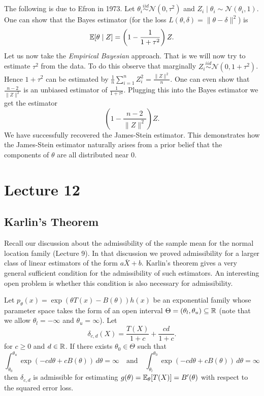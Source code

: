 The following is due to Efron in 1973. Let $\theta_i \overset{iid}{\sim}  \mathcal{N}(0, \tau^2)$ and $Z_i \mid \theta_i \sim \mathcal{N}(\theta_i, 1).$ One can show that the Bayes estimator (for the loss $L(\theta, \delta) = \|\theta - \delta\|^2$) is \[
	\mathbb{E}[\theta \mid Z] = \left(1 - \frac{1}{1+\tau^2}\right) Z.
\] Let us now take the \textit{Empirical Bayesian} approach. That is we will now try to estimate $\tau^2$ from the data. To do this observe that marginally $Z_i \overset{iid}{\sim} \mathcal N(0, 1 + \tau^2)$. Hence $1 + \tau^2$ can be estimated by $\frac{1}{n} \sum_{i=1}^n Z_i^2 = \frac{\|Z\|^2}{n}$.  One can even show that $\frac{n-2}{\|Z\|^2}$ is an unbiased estimator of $\frac{1}{1+\tau^2}$. Plugging this into the Bayes estimator we get the estimator \[
	\left(1 - \frac{n-2}{\|Z\|^2}\right) Z.
\] We have successfully recovered the James-Stein estimator. This demonstrates how the James-Stein estimator naturally arises from a prior belief that the components of $\theta$ are all distributed near $0$. 





\newpage

\section{Lecture 12}

\subsection{Karlin's Theorem}

Recall our discussion about the admissibility of the sample mean for the normal location family (Lecture 9). In that discussion we proved admissibility for a larger class of linear estimators of the form $a \bar{X} + b$. Karlin's theorem gives a very general sufficient condition for the admissibility of such estimators. An interesting open problem is whether this condition is also necessary for admissibility.

\begin{theorem}
	Let $p_\theta(x) = \exp(\theta T(x) - B(\theta)) h(x)$ be an exponential family whose parameter space takes the form of an open interval $\Theta = (\theta_l, \theta_u) \subseteq \mathbb{R}$ (note that we allow $\theta_l = -\infty$ and $\theta_u = \infty$). Let \[
		\delta_{c,d}(X) = \frac{T(X)}{1+c} + \frac{cd}{1+c}. 
	\] for $c \geq 0$ and $d \in \mathbb{R}$. If there exists $\theta_0 \in \Theta$ such that \[
		\int_{\theta_0}^{\theta_u} \exp({-cd\theta + cB(\theta)}) \, d\theta = \infty \quad \text{and} \quad 
		\int_{\theta_l}^{\theta_0} \exp({-cd\theta + cB(\theta)}) \, d\theta = \infty
	\] then $\delta_{c,d}$ is admissible for estimating $g(\theta) = \mathbb{E}_\theta[T(X)] = B'(\theta)$ with respect to the squared error loss.
\end{theorem}

